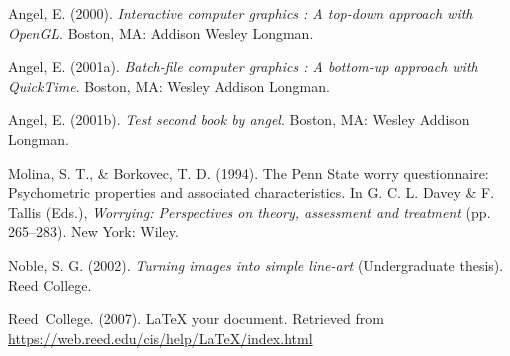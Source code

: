 \hypertarget{refs}{}
\begin{CSLReferences}{1}{0}
\leavevmode{}%
Angel, E. (2000). \emph{Interactive computer graphics : A top-down approach with OpenGL}. Boston, MA: Addison Wesley Longman.

\leavevmode{}%
Angel, E. (2001a). \emph{Batch-file computer graphics : A bottom-up approach with QuickTime}. Boston, MA: Wesley Addison Longman.

\leavevmode{}%
Angel, E. (2001b). \emph{Test second book by angel}. Boston, MA: Wesley Addison Longman.

\leavevmode{}%
Molina, S. T., \& Borkovec, T. D. (1994). The {P}enn {S}tate worry questionnaire: Psychometric properties and associated characteristics. In G. C. L. Davey \& F. Tallis (Eds.), \emph{Worrying: Perspectives on theory, assessment and treatment} (pp. 265--283). New York: Wiley.

\leavevmode{}%
Noble, S. G. (2002). \emph{Turning images into simple line-art} (Undergraduate thesis). Reed College.

\leavevmode{}%
Reed~College. (2007). LaTeX your document. Retrieved from \url{https://web.reed.edu/cis/help/LaTeX/index.html}

\end{CSLReferences}



